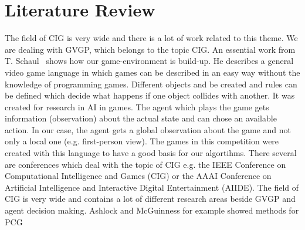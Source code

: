 \section{Literature Review} \label{sec:lit}

The field of \ac{CIG} is very wide and there is a lot of work related  to this theme. We are dealing with \ac{GVGP}, which belongs to the topic \ac{CIG}. 
An essential work from T. Schaul~\cite{schaul2013pyvgdl} shows how our game-environment is build-up. He describes a general video game language in which games can be described in an easy way without the knowledge of programming games. Different objects and be created and rules can be defined which decide what happens if one object collides with another. It was created for research in \ac{AI} in games. The agent which plays the game gets information (observation) about the actual state and can chose an available action. In our case, the agent gets a global observation about the game and not only a local one (e.g. first-person view). The games in this competition were created with this language to have a good basis for our algortihms.
There several are conferences which deal with the topic of \ac{CIG} e.g. the IEEE Conference on Computational Intelligence and Games (CIG) or the AAAI Conference on Artificial Intelligence and Interactive Digital Entertainment (AIIDE). The field of \ac{CIG} is very wide and contains a lot of different research areas beside \ac{GVGP} and agent decision making. Ashlock and McGuinness for example showed methods for \ac{PCG}